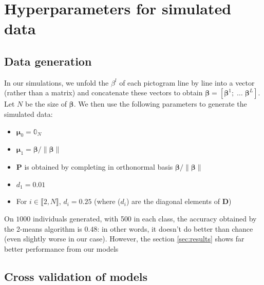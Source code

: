 \documentclass[preprint,12pt]{elsarticle}
\begin{document}
\newpage

\section{Hyperparameters for simulated data}
\label{annexe:hyperparam}
\subsection{Data generation}

\noindent In our simulations, we unfold the $\beta^l$ of each pictogram line by line into a vector (rather than a matrix) and concatenate these vectors to obtain $\bm{\beta} = [\bm{\beta}^1; \; \hdots \; \bm{\beta}^L]$. Let $N$ be the size of $\bm{\beta}$. We then use the following parameters to generate the simulated data:
\begin{itemize}[label = $\bullet$]
    \item $\bm{\mu}_0 = \mathbb{0}_N$
    \item $\bm{\mu}_1 = \bm{\beta}/\lVert \bm{\beta}\rVert$ 
    \item $\mathbf{P}$ is obtained by completing in orthonormal basis $\bm{\beta}/\lVert \bm{\beta}\rVert$
    \item $d_1 = 0.01$
    \item For $i \in \llbracket 2, N \rrbracket$, $d_i = 0.25$ (where ($d_i$) are the diagonal elements of $\mathbf{D}$) 
\end{itemize}

On $1000$ individuals generated, with 500 in each class, the accuracy obtained by the 2-means algorithm is $0.48$: in other words, it doesn't do better than chance (even slightly worse in our case). However, the section \ref{sec:results} shows far better performance from our models

\subsection{Cross validation of models}
\end{document}
